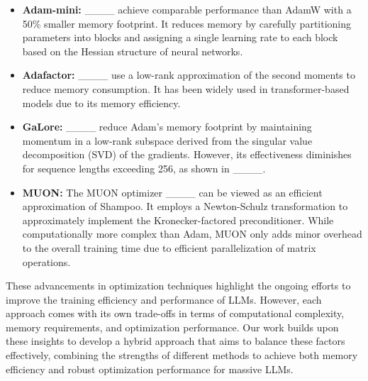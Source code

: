 \begin{itemize}

\item \textbf{Adam-mini:} ____ achieve comparable performance than AdamW with a 50\% smaller memory footprint. It reduces memory by carefully partitioning parameters into blocks and assigning a single learning rate to each block based on the Hessian structure of neural networks. 

\item \textbf{Adafactor:} ____ use a low-rank approximation of the second moments to reduce memory consumption. It has been widely used in transformer-based models due to its memory efficiency.

\item \textbf{GaLore:} ____ reduce Adam's memory footprint by maintaining momentum in a low-rank subspace derived from the singular value decomposition (SVD) of the gradients. However, its effectiveness diminishes for sequence lengths exceeding 256, as shown in ____.

\item \textbf{MUON:} The MUON optimizer ____ can be viewed as an efficient approximation of Shampoo. It employs a Newton-Schulz transformation to approximately implement the Kronecker-factored preconditioner. While computationally more complex than Adam, MUON only adds minor overhead to the overall training time due to efficient parallelization of matrix operations.

\end{itemize}

These advancements in optimization techniques highlight the ongoing efforts to improve the training efficiency and performance of LLMs. However, each approach comes with its own trade-offs in terms of computational complexity, memory requirements, and optimization performance. Our work builds upon these insights to develop a hybrid approach that aims to balance these factors effectively, combining the strengths of different methods to achieve both memory efficiency and robust optimization performance for massive LLMs.